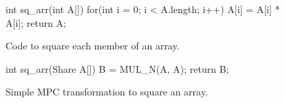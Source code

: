 \begin{figure}[h]
\centering
\begin{minipage}{0.7\textwidth}
\begin{code}
int sq\_arr(int A[]) {
    for(int i = 0; i < A.length; i++) {
        A[i] = A[i] * A[i];
    }
    return A;
}
\end{code}
\end{minipage}
\caption{Code to square each member of an array.}
\label{fig:squarearray}
\end{figure}

\begin{figure}[h]
\centering
\begin{minipage}{0.7\textwidth}
\begin{code}
int sq\_arr(Share A[]) {
    B = MUL\_N(A, A);
    return B;
}
\end{code}
\end{minipage}
\caption{Simple MPC transformation to square an array.}
\label{fig:squarearraympc}
\end{figure}



